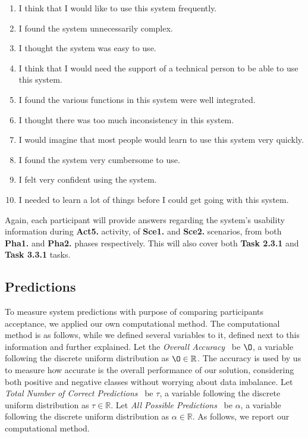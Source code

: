 \begin{enumerate}
\item I think that I would like to use this system frequently.
\item I found the system unnecessarily complex.
\item I thought the system was easy to use.
\item I think that I would need the support of a technical person to be able to use this system.
\item I found the various functions in this system were well integrated.
\item I thought there was too much inconsistency in this system.
\item I would imagine that most people would learn to use this system very quickly.
\item I found the system very cumbersome to use.
\item I felt very confident using the system.
\item I needed to learn a lot of things before I could get going with this system.
\end{enumerate}

Again, each participant will provide answers regarding the system's usability information during {\bf Act5.} activity, of {\bf Sce1.} and {\bf Sce2.} scenarios, from both {\bf Pha1.} and {\bf Pha2.} phases respectively. This will also cover both {\bf Task 2.3.1} and {\bf Task 3.3.1} tasks.

\subsection{Predictions}

To measure system predictions with purpose of comparing participants acceptance, we applied our own computational method. The computational method is as follows, while we defined several variables to it, defined next to this information and further explained. Let the {\it Overall Accuracy}~\cite{ashraf2018comparative, li2018digital} be $\O$, a variable following the discrete uniform distribution as $\O \in \mathbb{R}$. The accuracy is used by us to measure how accurate is the overall performance of our solution, considering both positive and negative classes without worrying about data imbalance. Let {\it Total Number of Correct Predictions}~\cite{ashraf2018comparative, li2018digital} be $\tau$, a variable following the discrete uniform distribution as $\tau \in \mathbb{R}$. Let {\it All Possible Predictions}~\cite{ashraf2018comparative, li2018digital} be $\alpha$, a variable following the discrete uniform distribution as $\alpha \in \mathbb{R}$. As follows, we report our computational method.

